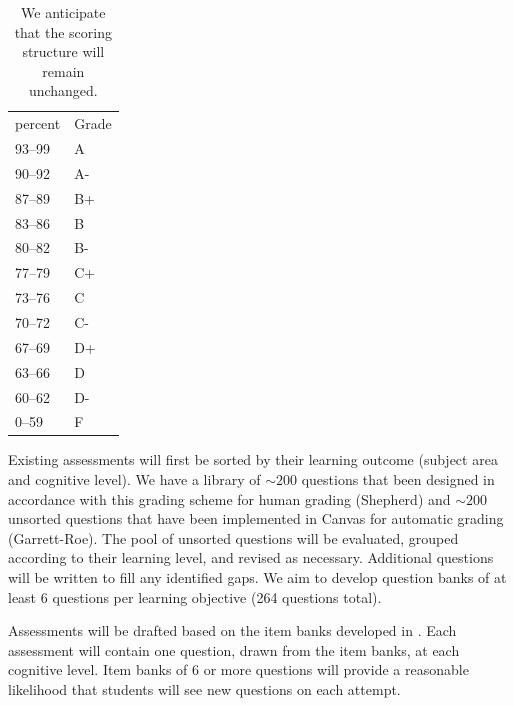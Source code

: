 \documentclass[10pt,letterpaper]{article}
\begin{document}
\begin{table}
\sffamily\footnotesize
\begin{tabular}{ll}
percent&Grade\\
93--99&A\\
90--92&A-\\
87--89&B+\\
83--86&B\\
80--82&B-\\
77--79&C+\\
73--76&C\\
70--72&C-\\
67--69&D+\\
63--66&D\\
60--62&D-\\
0--59&F
\end{tabular}
\caption{\label{tbl:points}
We anticipate that the scoring structure will remain unchanged.} 
\end{table}

%
%


\label{ssa:question_bank} Existing assessments will first be sorted by their learning outcome (subject area and cognitive level). We have a library of $\sim200$ questions that been designed in accordance with this grading scheme for human grading (Shepherd) and $\sim200$ unsorted questions that have been implemented in Canvas for automatic grading (Garrett-Roe). The pool of unsorted questions will be evaluated, grouped according to their learning level, and revised as necessary. Additional questions will be written to fill any identified gaps. We aim to develop question banks of at least $6$ questions per learning objective (264 questions total). 



Assessments will be drafted based on the item banks developed in . Each assessment will contain one question, drawn from the item banks, at each cognitive level. Item banks of 6 or more questions will provide a reasonable likelihood that students will see new questions on each attempt.
\end{document}
